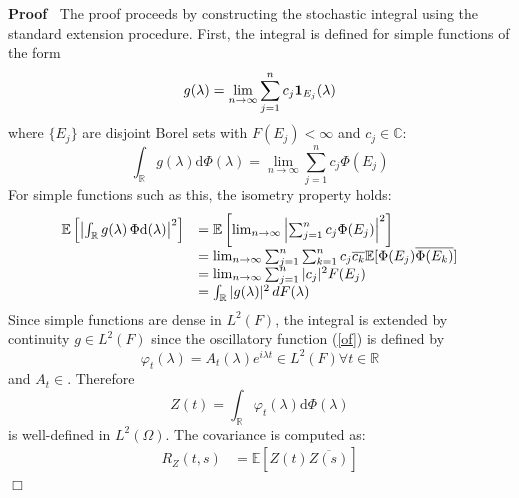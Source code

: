 \documentclass{article}
\newcommand{\mathd}{\mathrm{d}}
\newcommand{\tmtextbf}[1]{\text{{\bfseries{#1}}}}
\newenvironment{proof}{\noindent\textbf{Proof\ }}{\hspace*{\fill}$\Box$\medskip}
\begin{document}
\begin{proof}
  The proof proceeds by constructing the stochastic integral using the
  standard extension procedure. First, the integral is defined for simple
  functions of the form
  \begin{equation}
    g (\lambda) = \lim_{n \rightarrow \infty} \sum_{j = 1}^n c_j
    \text{\tmtextbf{1}}_{E_j} (\lambda)
  \end{equation}
  where $\{E_j \}$ are disjoint Borel sets with $F (E_j) < \infty$ and $c_j
  \in \mathbb{C}$:
  \begin{equation}
    \int_{\mathbb{R}} g (\lambda) \mathd \Phi (\lambda) = \lim_{n \rightarrow
    \infty} \sum_{j = 1}^n c_j \Phi (E_j)
  \end{equation}
  For simple functions such as this, the isometry property holds:
  \begin{equation}
    \begin{array}{ll}
      \mathbb{E} \left[ \left| \int_{\mathbb{R}} g (\lambda) \hspace{0.17em}
      \Phi \mathd (\lambda) \right|^2 \right] & =\mathbb{E} \left[ \lim_{n
      \rightarrow \infty} \left| \sum_{j = 1}^n c_j \Phi (E_j) \right|^2
      \right]\\
      & = \lim_{n \rightarrow \infty} \sum_{j = 1}^n \sum_{k = 1}^n c_j
      \overline{c_k} \mathbb{E} [\Phi (E_j) \overline{\Phi (E_k)}]\\
      & = \lim_{n \rightarrow \infty} \sum_{j = 1}^n |c_j |^2 F (E_j)\\
      & = \int_{\mathbb{R}} |g (\lambda) |^2  \hspace{0.17em} dF (\lambda)
    \end{array}
  \end{equation}
  Since simple functions are dense in $L^2 (F)$, the integral is extended by
  continuity {\forall}$g \in L^2 (F)$ since the oscillatory function
  (\ref{of}) is defined by
  \begin{equation}
    \varphi_t (\lambda) = A_t (\lambda) e^{i \lambda t} \in L^2 (F) \forall t
    \in \mathbb{R}
  \end{equation}
  and $A_t \in$. Therefore
  \begin{equation}
    Z (t) = \int_{\mathbb{R}} \varphi_t (\lambda) \mathd \Phi (\lambda)
  \end{equation}
  is well-defined in $L^2 (\Omega)$. The covariance is computed as:
  \begin{equation}
    \begin{array}{ll}
      R_Z (t, s) & =\mathbb{E} [Z (t) \overline{Z (s)}]\\

\end{array}
\end{equation}
\end{proof}
\end{document}
